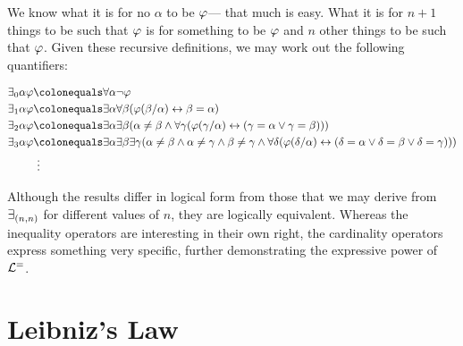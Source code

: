 We know what it is for no $\alpha$ to be $\varphi$--- that much is easy.
What it is for $n+1$ things to be such that $\varphi$ is for something to be $\varphi$ and $n$ other things to be such that $\varphi$. 
Given these recursive definitions, we may work out the following quantifiers:

\vspace{-.2in}
\begin{align*}
  \qt{\exists_0}{\alpha}\metaA &\colonequals \qt{\forall}{\alpha}\enot\metaA\\
  \qt{\exists_1}{\alpha}\metaA &\colonequals \qt{\exists}{\alpha}\qt{\forall}{\beta}(\metaA(\beta/\alpha) \eiff \beta = \alpha)\\ 
  \qt{\exists_2}{\alpha}\metaA &\colonequals \qt{\exists}{\alpha}\qt{\exists}{\beta}(\alpha\neq\beta \eand \qt{\forall}{\gamma}(\metaA(\gamma/\alpha) \eiff (\gamma = \alpha \eor \gamma = \beta)))\\
  \qt{\exists_3}{\alpha}\metaA &\colonequals \qt{\exists}{\alpha}
      \qt{\exists}{\beta}
        \qt{\exists}{\gamma}(
          \alpha\neq\beta \eand \alpha\neq\gamma \eand \beta\neq\gamma \eand \qt{\forall}{\delta}(
            \metaA(\delta/\alpha) \eiff (
              \delta = \alpha \eor \delta = \beta \eor \delta = \gamma
            )
          )
        )\\
  & ~\vdots
\end{align*}

Although the results differ in logical form from those that we may derive from $\qt{\exists_{(n,n)}}$ for different values of $n$, they are logically equivalent.
Whereas the inequality operators are interesting in their own right, the cardinality operators express something very specific, further demonstrating the expressive power of $\mathcal{L}^{=}$.




\section{Leibniz's Law}

